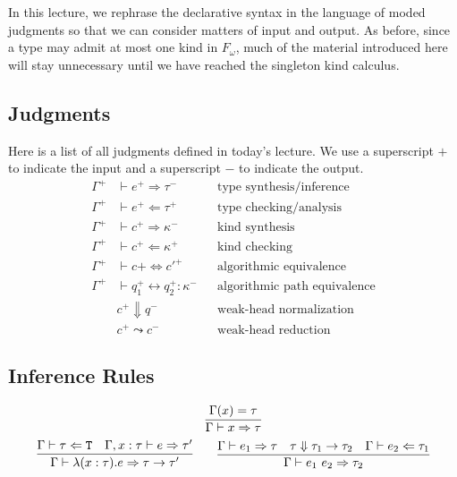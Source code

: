 
In this lecture, we rephrase the declarative syntax in the language of moded
judgments so that we can consider matters of input and output. As before, since
a type may admit at most one kind in $F_\omega$, much of the material introduced
here will stay unnecessary until we have reached the singleton kind calculus.

\subsection{Judgments}

Here is a list of all judgments defined in today's lecture. We use a superscript $+$
to indicate the input and a superscript $-$ to indicate the output.
\begin{align*}
  \Gamma^+ &\vdash e^+ \Rightarrow \tau^- &&\text{type synthesis/inference}\\
  \Gamma^+ &\vdash e^+ \Leftarrow \tau^+ &&\text{type checking/analysis}\\
  \Gamma^+ &\vdash c^+ \Rightarrow \kappa^- &&\text{kind synthesis}\\
  \Gamma^+ &\vdash c^+ \Leftarrow \kappa^+ &&\text{kind checking}\\
  \Gamma^+ &\vdash c+ \Leftrightarrow c'^+ &&\text{algorithmic equivalence}\\
  \Gamma^+ &\vdash q_1^+ \leftrightarrow q_2^+ : \kappa^- &&\text{algorithmic path equivalence}\\
  &c^+ \Downarrow q^- &&\text{weak-head normalization}\\
  &c^+ \leadsto c^- &&\text{weak-head reduction}
\end{align*}

\subsection{Inference Rules}

\begin{judgment}
\[ \infer{\Gamma \vdash x \Rightarrow \tau}{\Gamma(x) = \tau} \]
\[
  \infer
    {\Gamma \vdash \lambda (x : \tau).e \Rightarrow \tau \rightarrow \tau'}
    {\Gamma \vdash \tau \Leftarrow \T
    &\Gamma,x : \tau \vdash e \Rightarrow \tau'
    }
  \qquad
  \infer
    {\Gamma \vdash e_1~e_2 \Rightarrow \tau_2}
    {\Gamma \vdash e_1 \Rightarrow \tau
    &\tau \Downarrow \tau_1 \rightarrow \tau_2
    &\Gamma \vdash e_2 \Leftarrow \tau_1
    }
\]
\end{judgment}

